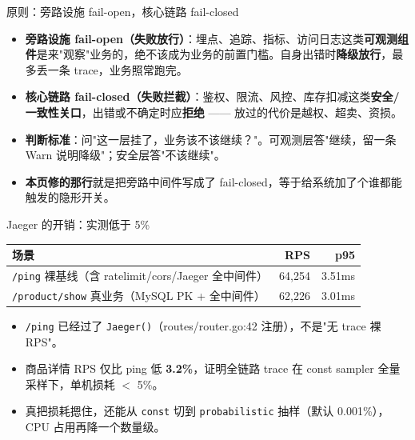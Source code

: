 \documentclass[aspectratio=169,11pt]{beamer}
\begin{document}
\begin{frame}[shrink]{原则：旁路设施 fail-open，核心链路 fail-closed}
\begin{itemize}
  \item \textbf{旁路设施 fail-open（失败放行）}：埋点、追踪、指标、访问日志这类\textbf{可观测组件}是来"观察"业务的，绝不该成为业务的前置门槛。自身出错时\textbf{降级放行}，最多丢一条 trace，业务照常跑完。
  \item \textbf{核心链路 fail-closed（失败拦截）}：鉴权、限流、风控、库存扣减这类\textbf{安全/一致性关口}，出错或不确定时应\textbf{拒绝} —— 放过的代价是越权、超卖、资损。
  \item \textbf{判断标准}：问"这一层挂了，业务该不该继续？"。可观测层答"继续，留一条 Warn 说明降级"；安全层答"不该继续"。
  \item \textbf{本页修的那行}就是把旁路中间件写成了 fail-closed，等于给系统加了个谁都能触发的隐形开关。
\end{itemize}
\end{frame}

\begin{frame}[shrink]{Jaeger 的开销：实测低于 5\%}
\begin{tabular}{@{}lrr@{}}
\toprule
场景 & RPS & p95 \\
\midrule
\texttt{/ping} 裸基线（含 ratelimit/cors/Jaeger 全中间件） & 64{,}254 & 3.51ms \\
\texttt{/product/show} 真业务（MySQL PK + 全中间件）        & 62{,}226 & 3.01ms \\
\bottomrule
\end{tabular}
\vspace{3mm}
\begin{itemize}
  \item \texttt{/ping} 已经过了 \texttt{Jaeger()}（routes/router.go:42 注册），不是"无 trace 裸 RPS"。
  \item 商品详情 RPS 仅比 ping 低 \textbf{3.2\%}，证明全链路 trace 在 const sampler 全量采样下，单机损耗 $<$ 5\%。
  \item 真把损耗摁住，还能从 \texttt{const} 切到 \texttt{probabilistic} 抽样（默认 0.001\%），CPU 占用再降一个数量级。
\end{itemize}
\end{frame}
\end{document}
